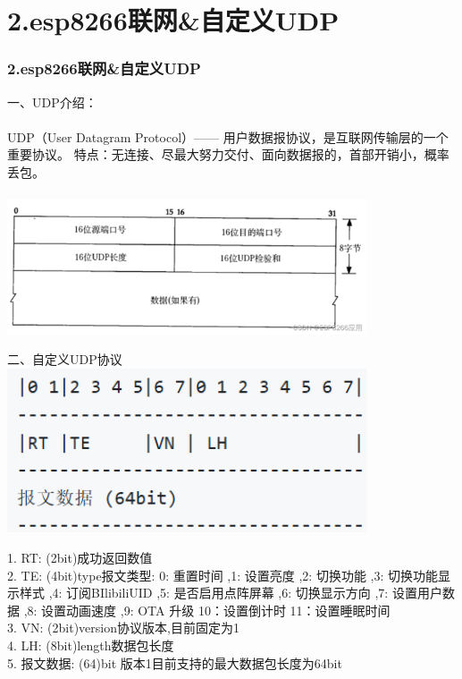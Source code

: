 \documentclass[16pt]{beamer}	%
\newcommand{\ftitle}[1]{\frametitle{#1}}	%
\begin{document}
		\section{2.esp8266联网\&自定义UDP}
		\begin{frame}
			\ftitle{2.esp8266联网\&自定义UDP}
		一、UDP介绍：
	    \\ \hspace*{\fill} \\UDP（User Datagram Protocol）——  用户数据报协议，是互联网传输层的一个重要协议。
		特点：无连接、尽最大努力交付、面向数据报的，首部开销小，概率丢包。
		\\ \hspace*{\fill} \\\centering \includegraphics[width=0.8\textwidth]{pic/2-1.png}
		\end{frame}
		\begin{frame}
		二、自定义UDP协议
			\\  \centering \includegraphics[width=0.8\textwidth]{pic/2-2.png}
			\begin{flushleft}
			1. RT: (2bit)成功返回数值
			\\2. TE: (4bit)type报文类型: 0: 重置时间 ,1: 设置亮度 ,2: 切换功能 ,3: 切换功能显示样式 ,4: 订阅BIlibiliUID ,5: 是否启用点阵屏幕 ,6: 切换显示方向 ,7: 设置用户数据 ,8: 设置动画速度 ,9: OTA 升级 10：设置倒计时 11：设置睡眠时间
			\\3. VN: (2bit)version协议版本,目前固定为1
			\\4. LH: (8bit)length数据包长度
			\\5. 报文数据: (64)bit 版本1目前支持的最大数据包长度为64bit
	    	\end{flushleft}
		\end{frame}
	
\end{document}
